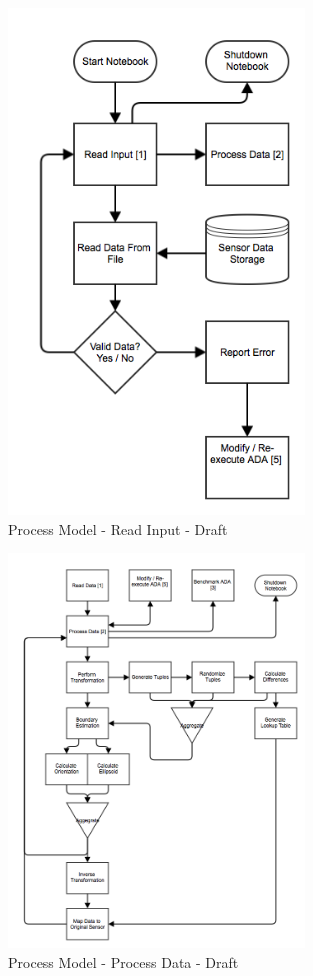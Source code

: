 \documentclass[twoside]{article}
\begin{document}
\begin{figure}[h]
    \centering
	\includegraphics[width=0.7\textwidth]{"images/process_model_read_input_1_"}
    \caption{Process Model - Read Input - Draft}
    \label{fig:process_model_input_draft}
\end{figure}

\begin{figure}[h]
    \centering
	\includegraphics[width=0.7\textwidth]{"images/process_model_process_data_2_"}
    \caption{Process Model - Process Data - Draft}
    \label{fig:process_model_process_data_draft}
\end{figure}
\end{document}
